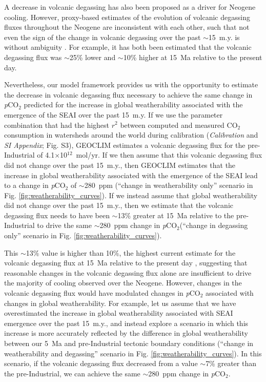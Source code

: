 \documentclass[9pt,twocolumn,twoside,lineno]{pnas-new}
\newcommand{\pCOtwo}{\textit{p}CO$_{2}$\xspace}
\newcommand{\COtwo}{CO$_{2}$\xspace}
\newcommand{\SI}{\textit{SI Appendix}\xspace}
\begin{document}
A decrease in volcanic degassing \cite{Berner1983a} has also been proposed as a driver for Neogene cooling. However, proxy-based estimates of the evolution of volcanic degassing fluxes throughout the Neogene are inconsistent with each other, such that not even the sign of the change in volcanic degassing over the past $\sim$15~m.y. is without ambiguity \cite{Godderis2017c}. For example, it has both been estimated that the volcanic degassing flux was $\sim$25\% lower \cite{Cogne2006a} and $\sim$10\% higher \cite{Van-Der-Meer2014a} at 15~Ma relative to the present day.

Nevertheless, our model framework provides us with the opportunity to estimate the decrease in volcanic degassing flux necessary to achieve the same change in \pCOtwo predicted for the increase in global weatherability associated with the emergence of the SEAI over the past 15~m.y. If we use the parameter combination that had the highest $r^{2}$ between computed and measured \COtwo consumption in watersheds around the world during calibration (\textit{Calibration} and \SI; Fig. S3), GEOCLIM estimates a volcanic degassing flux for the pre-Industrial of 4.1$\times$10$^{12}$~mol/yr. If we then assume that this volcanic degassing flux did not change over the past 15~m.y., then GEOCLIM estimates that the increase in global weatherability associated with the emergence of the SEAI lead to a change in \pCOtwo of $\sim$280~ppm (``change in weatherability only'' scenario in Fig. \ref{fig:weatherability_curves}). If we instead assume that global weatherability did not change over the past 15~m.y., then we estimate that the volcanic degassing flux needs to have been $\sim$13\% greater at 15~Ma relative to the pre-Industrial to drive the same $\sim$280~ppm change in \pCOtwo (``change in degassing only'' scenario in Fig. \ref{fig:weatherability_curves}).

This $\sim$13\% value is higher than 10\%, the highest current estimate for the volcanic degassing flux at 15~Ma relative to the present day \cite{Van-Der-Meer2014a}, suggesting that reasonable changes in the volcanic degassing flux alone are insufficient to drive the majority of cooling observed over the Neogene. However, changes in the volcanic degassing flux would have modulated changes in \pCOtwo associated with changes in global weatherability. For example, let us assume that we have overestimated the increase in global weatherability associated with SEAI emergence over the past 15~m.y., and instead explore a scenario in which this increase is more accurately reflected by the difference in global weatherability between our 5~Ma and pre-Industrial tectonic boundary conditions (``change in weatherability and degassing'' scenario in Fig. \ref{fig:weatherability_curves}). In this scenario, if the volcanic degassing flux decreased from a value $\sim$7\% greater than the pre-Industrial, we can achieve the same $\sim$280~ppm change in \pCOtwo.
\end{document}
